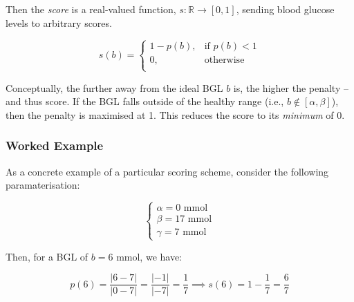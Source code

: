 \documentclass[oneside,a4paper]{article}
\theoremstyle{remark}
\begin{document}
                Then the \textit{score} is a real-valued function, \(s:\mathbb{R}\rightarrow[0,1]\), sending blood glucose levels to arbitrary scores.
        
                \[
                    s\left(b\right)=\begin{cases}
                        1-p\left(b\right), & \text{if } p\left(b\right)<1\\
                        0, & \text{otherwise}\\
                    \end{cases}
                \]
                
                Conceptually, the further away from the ideal BGL \(b\) is, the higher the penalty -- and thus score. If the BGL falls outside of the healthy range (i.e., \(b\notin[\alpha, \beta]\)), then the penalty is maximised at 1. This reduces the score to its \textit{minimum} of 0.
        
        
            \subsubsection{Worked Example}
                As a concrete example of a particular scoring scheme, consider the following paramaterisation:
        
                \[
                    \begin{cases}
                        \alpha=0\text{ mmol}\\
                        \beta=17\text{ mmol}\\
                        \gamma=7\text{ mmol}
                    \end{cases}
                \]
        
                Then, for a BGL of \(b=6\text{ mmol}\), we have:
        
                \[
                    p\left(6\right)=\frac{|6-7|}{|0-7|}=\frac{|-1|}{|-7|}=\frac{1}{7}\implies s\left(6\right)=1-\frac{1}{7}=\frac{6}{7}
                \]

\end{document}
